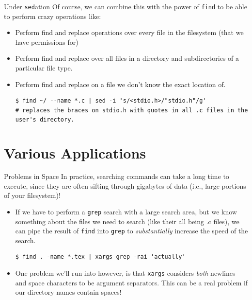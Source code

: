 \documentclass[11pt]{beamer}
\begin{document}
\begin{frame}[fragile=singleslide]{Under \texttt{sed}ation}
Of course, we can combine this with the power of \texttt{find} to be able to perform crazy operations like:
\begin{itemize}
\item Perform find and replace operations over every file in the filesystem (that we have permissions for)
\item Perform find and replace over all files in a directory and subdirectories of a particular file type.
\item Perform find and replace on a file we don't know the exact location of.
\begin{lstlisting}[style=terminal]
$ find ~/ --name *.c | sed -i 's/<stdio.h>/"stdio.h"/g' 
# replaces the braces on stdio.h with quotes in all .c files in the user's directory.  
\end{lstlisting}

\end{itemize}
\end{frame}

\section[Applications]{Various Applications}
\begin{frame}[fragile=singleslide]{Problems in Space}
In practice, searching commands can take a long time to execute, since they are often sifting through gigabytes of data (i.e., large portions of your filesystem)!
\begin{itemize}
\item If we have to perform a \texttt{grep} search with a large search area, but we know something about the files we need to search (like their all being .c files), we can pipe the result of \texttt{find} into \texttt{grep} to \emph{substantially} increase the speed of the search.  
\begin{lstlisting}[style=terminal]
$ find . -name *.tex | xargs grep -rai 'actually'
\end{lstlisting}
\item One problem we'll run into however, is that \texttt{xargs} considers 
\emph{both} newlines and space characters to be argument separators.  This can be a real problem if our directory names contain spaces! 
\end{itemize}  
\end{frame}
\end{document}
